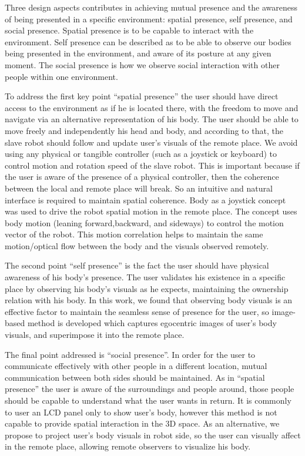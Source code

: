 Three design aspects \cite{biocca1997cyborg,bracken2010immersed} contributes in achieving mutual presence and the awareness of being presented in a specific environment: spatial presence, self presence, and social presence. Spatial presence is to be capable to interact with the environment. Self presence can be described as to be able to observe our bodies being presented in the environment, and aware of its posture at any given moment. The social presence is how we observe social interaction with other people within one environment. 

To address the first key point ``spatial presence'' the user should have direct access to the environment as if he is located there, with the freedom to move and navigate via an alternative representation of his body. The user should be able to move freely and independently his head and body, and according to that, the slave robot should follow and update user’s visuals of the remote place. We avoid using any physical or tangible controller (such as a joystick or keyboard) to control motion and rotation speed of the slave robot. This is important because if the user is aware of the presence of a physical controller, then the coherence between the local and remote place will break. So an intuitive and natural interface is required to maintain spatial coherence. Body as a joystick concept was used to drive the robot spatial motion in the remote place. The concept uses body motion (leaning forward,backward, and sideways) to control the motion vector of the robot. This motion correlation helps to maintain the same motion/optical flow between the body and the visuals observed remotely.

The second point ``self presence'' is the fact the user should have physical awareness of his body’s presence. The user validates his existence in a specific place by observing his body’s visuals as he expects, maintaining the ownership relation with his body. In this work, we found that observing body visuals is an effective factor to maintain the seamless sense of presence for the user, so image-based method is developed which captures egocentric images of user’s body visuals, and superimpose it into the remote place. 

The final point addressed is ``social presence''. In order for the user to communicate effectively with other people in a different location, mutual communication between both sides should be maintained. As in  ``spatial presence'' the user is aware of the surroundings and people around, those people should be capable to understand what the user wants in return. It is commonly to user an LCD panel only to show user’s body, however this method is not capable to provide spatial interaction in the 3D space. As an alternative, we propose to project user’s body visuals in robot side, so the user can visually affect in the remote place, allowing remote observers to visualize his body.

